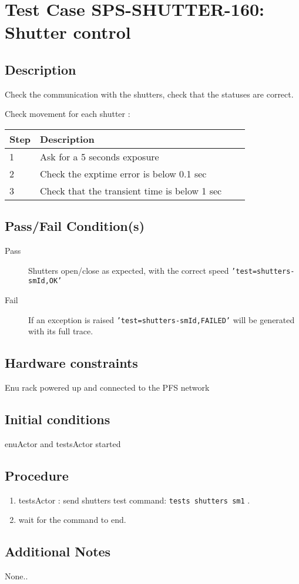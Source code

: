 \section{Test Case SPS-SHUTTER-160: Shutter control}

\subsection{Description}

Check the communication with the shutters, check that the statuses are correct.

Check movement for each shutter :
\begin{table}[H]
    \begin{tabular}{|l| p{10cm} |l| p{10cm} |}
    \hline
    {\bf Step} & {\bf Description}   \\ \hline
    1 & Ask for a 5 seconds exposure     \\ \hline
    2 & Check the exptime error is below 0.1 sec     \\ \hline
    3 & Check that the transient time is below 1 sec     \\ \hline
    \end{tabular}
\end{table}


\subsection{Pass/Fail Condition(s)}

\begin{description}
\item [Pass] Shutters open/close as expected, with the correct speed \texttt{'test=shutters-smId,OK'}
\item [Fail] If an exception is raised \texttt{'test=shutters-smId,FAILED'} will be generated with its full trace.
\end{description}

\subsection{Hardware constraints}

Enu rack powered up and connected to the PFS network

\subsection{Initial conditions}
enuActor and testsActor started

\subsection{Procedure}

\begin{enumerate}
    \item testsActor : send shutters test command: \texttt{tests shutters sm1} .
    \item wait for the command to end.
\end{enumerate}



\subsection{Additional Notes}

None..
